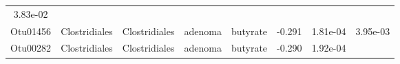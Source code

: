 \documentclass[11pt,]{article}
\begin{document}
\begin{longtable}[]{@{}cccccccc@{}}
\begin{minipage}[t]{0.08\columnwidth}
3.83e-02\strut
\end{minipage}\tabularnewline
\begin{minipage}[t]{0.08\columnwidth}\centering\strut
Otu01456\strut
\end{minipage} & \begin{minipage}[t]{0.15\columnwidth}\centering\strut
Clostridiales\strut
\end{minipage} & \begin{minipage}[t]{0.15\columnwidth}\centering\strut
Clostridiales\strut
\end{minipage} & \begin{minipage}[t]{0.08\columnwidth}\centering\strut
adenoma\strut
\end{minipage} & \begin{minipage}[t]{0.09\columnwidth}\centering\strut
butyrate\strut
\end{minipage} & \begin{minipage}[t]{0.07\columnwidth}\centering\strut
-0.291\strut
\end{minipage} & \begin{minipage}[t]{0.08\columnwidth}\centering\strut
1.81e-04\strut
\end{minipage} & \begin{minipage}[t]{0.08\columnwidth}\centering\strut
3.95e-03\strut
\end{minipage}\tabularnewline
\begin{minipage}[t]{0.08\columnwidth}\centering\strut
Otu00282\strut
\end{minipage} & \begin{minipage}[t]{0.15\columnwidth}\centering\strut
Clostridiales\strut
\end{minipage} & \begin{minipage}[t]{0.15\columnwidth}\centering\strut
Clostridiales\strut
\end{minipage} & \begin{minipage}[t]{0.08\columnwidth}\centering\strut
adenoma\strut
\end{minipage} & \begin{minipage}[t]{0.09\columnwidth}\centering\strut
butyrate\strut
\end{minipage} & \begin{minipage}[t]{0.07\columnwidth}\centering\strut
-0.290\strut
\end{minipage} & \begin{minipage}[t]{0.08\columnwidth}\centering\strut
1.92e-04\strut
\end{minipage} & \begin{minipage}[t]{0.08\columnwidth}\centering\strut

\end{minipage}
\end{longtable}
\end{document}
